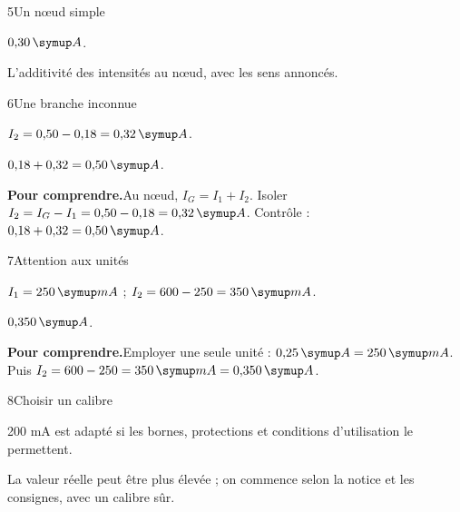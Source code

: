 \par\noindent\begin{minipage}{\linewidth}
\begin{corrige}{5}{Un nœud simple}
\begin{questions}
\item $0{,}30\unite A$.
\item L’additivité des intensités au nœud, avec les sens annoncés.
\end{questions}
\end{corrige}
\end{minipage}
\par\noindent\begin{minipage}{\linewidth}
\begin{corrige}{6}{Une branche inconnue}
\begin{questions}
\item $I_2=0{,}50-0{,}18=0{,}32\unite A$.
\item $0{,}18+0{,}32=0{,}50\unite A$.
\end{questions}
\par\smallskip\noindent\textbf{Pour comprendre.}\enspace Au nœud, $I_G=I_1+I_2$. Isoler $I_2=I_G-I_1=0{,}50-0{,}18=0{,}32\unite A$. Contrôle : $0{,}18+0{,}32=0{,}50\unite A$.\par
{}
\end{corrige}
\end{minipage}
\par\noindent\begin{minipage}{\linewidth}
\begin{corrige}{7}{Attention aux unités}
\begin{questions}
\item $I_1=250\unite{mA}$ ; $I_2=600-250=350\unite{mA}$.
\item $0{,}350\unite A$.
\end{questions}
\par\smallskip\noindent\textbf{Pour comprendre.}\enspace Employer une seule unité : $0{,}25\unite A=250\unite{mA}$. Puis $I_2=600-250=350\unite{mA}=0{,}350\unite A$.\par
\end{corrige}
\end{minipage}
\par\noindent\begin{minipage}{\linewidth}
\begin{corrige}{8}{Choisir un calibre}
\begin{questions}
\item 200 mA est adapté si les bornes, protections et conditions d’utilisation le permettent.
\item La valeur réelle peut être plus élevée ; on commence selon la notice et les consignes, avec un calibre sûr.
\end{questions}
\end{corrige}
\end{minipage}
